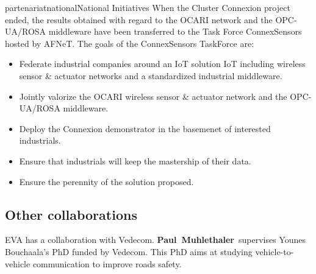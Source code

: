 \documentclass{ra2016}
\newcommand{\paul}             {\textbf{Paul~Muhlethaler}}
\begin{document}
\begin{module}{partenariat}{national}{National Initiatives}
When the Cluster Connexion project ended, the results obtained with regard to the OCARI network and the OPC-UA/ROSA middleware have been transferred to the Task Force ConnexSensors hosted by AFNeT. The goals of the ConnexSensors TaskForce are:
\begin{itemize}
\item	Federate industrial companies around an IoT solution IoT including wireless sensor \& actuator networks and a standardized industrial middleware.
\item Jointly valorize the OCARI wireless sensor \& actuator network and the OPC-UA/ROSA middleware.
\item Deploy the Connexion demonstrator in the basemenet of interested industrials. 
\item Ensure that industrials will keep the mastership of their data. 
\item Ensure the perennity of the solution proposed.\\
\end{itemize}





\subsection{Other collaborations}


EVA has a collaboration with Vedecom. 
\paul~supervises Younes Bouchaala's PhD funded by Vedecom. This PhD aims at 
studying vehicle-to-vehicle communication to improve roads safety. 

\end{module} 




\end{document}

